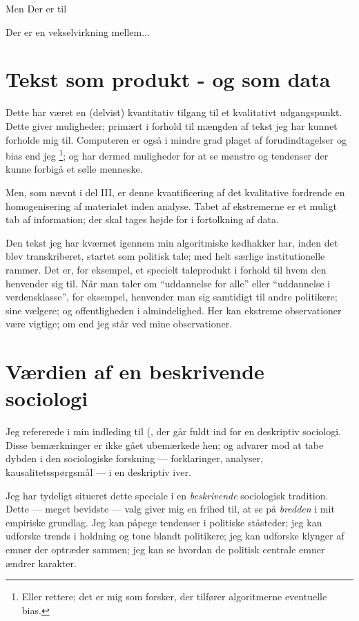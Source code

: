 Men 
Der er til

Der er en vekselvirkning mellem...

\section{Tekst som produkt - og som data}

Dette har været en (delvist) kvantitativ tilgang til et kvalitativt udgangspunkt.
Dette giver muligheder; primært i forhold til mængden af tekst jeg har kunnet forholde mig til.
Computeren er også i mindre grad plaget af forudindtagelser og bias end jeg
\footnote{Eller rettere; det er mig som forsker, der tilfører algoritmerne eventuelle bias.};
og har dermed muligheder for at se mønstre og tendenser der kunne forbigå et sølle menneske.

Men, som nævnt i del III, er denne kvantificering af det kvalitative fordrende en homogenisering af materialet inden analyse.
Tabet af ekstremerne er et muligt tab af information; der skal tages højde for i fortolkning af data.

Den tekst jeg har kværnet igennem min algoritmiske kødhakker har, inden det blev transkriberet, startet som politisk tale; med helt særlige institutionelle rammer.
Det er, for eksempel, et specielt taleprodukt i forhold til hvem den henvender sig til.
Når man taler om “uddannelse for alle” eller “uddannelse i verdensklasse”, for eksempel,
henvender man sig samtidigt til andre politikere; sine vælgere; og offentligheden i almindelighed.
Her kan ekstreme observationer være vigtige;
om end jeg står ved mine observationer.


\section{Værdien af en beskrivende sociologi}

Jeg refererede i min indleding til \citeauthor{savageContemporarySociologyChallenge2009} (\citeyear{savageContemporarySociologyChallenge2009}, der går fuldt ind for en deskriptiv sociologi.
Disse bemærkninger er ikke gået ubemærkede hen; og \citeauthor{ganeDescriptiveTurn2020} advarer mod at tabe dybden i den sociologiske forskning --- forklaringer, analyser, kausalitetsspørgsmål --- i en deskriptiv iver.

Jeg har tydeligt situeret dette speciale i en \textit{beskrivende} sociologisk tradition.
Dette — meget bevidste — valg giver mig en frihed til,
at se på \textit{bredden} i mit empiriske grundlag.
Jeg kan påpege tendenser i politiske ståsteder;
jeg kan udforske trends i holdning og tone blandt politikere;
jeg kan udforske klynger af emner der optræder sammen;
jeg kan se hvordan de politisk centrale emner ændrer karakter.

